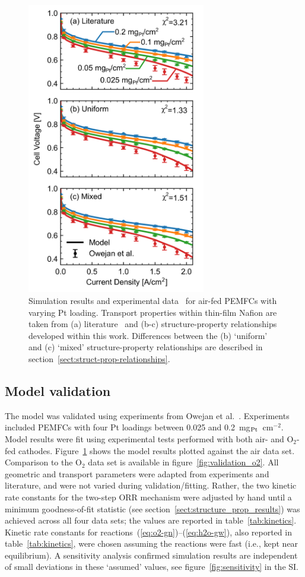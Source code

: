 \documentclass[final,3p,times,twocolumn]{elsarticle}    %
\newcommand{\crr}[1]{\color{red} #1 \color{black}}
\begin{document}
\begin{figure}[!tb]
    \centering
    \includegraphics[width=3.07in]{figures_uniform/validation-air-vert-3_07in.png}
    \crr{
    \caption{Simulation results and experimental data~\cite{bib:owejan_2013} for air-fed PEMFCs with varying Pt loading. Transport properties within thin-film Nafion are taken from (a) literature~\cite{bib:yadav_2012, bib:sethuraman_2009} and (b-c) structure-property relationships developed within this work. Differences between the (b) `uniform' and (c) `mixed' structure-property relationships are described in section~\ref{sect:struct-prop-relationships}.}}
    \label{fig:validation_air}
\end{figure}

\subsection{Model validation}
The model was validated using experiments from Owejan et al.~\cite{bib:owejan_2013}. Experiments included PEMFCs with four Pt loadings between 0.025 and 0.2~mg$_{\rm Pt}$~cm$^{-2}$. \crr{Model results were fit using experimental tests performed with both air- and O$_2$-fed cathodes.} Figure~\ref{fig:validation_air} shows the model results plotted against the air data set. Comparison to the O$_2$ data set is available in figure~\ref{fig:validation_o2}. All geometric and transport parameters were adapted from experiments and literature, and were not varied during validation/fitting. Rather, the two kinetic rate constants for the two-step ORR mechanism were adjusted by hand until a minimum goodness-of-fit statistic (see section~\ref{sect:structure_prop_results}) was achieved across all four data sets; the values are reported in table~\ref{tab:kinetics}. \crr{Kinetic rate constants for reactions~(\ref{eq:o2-gn})--(\ref{eq:h2o-gw}), also reported in table~\ref{tab:kinetics}, were chosen assuming the reactions were fast (i.e., kept near equilibrium). A sensitivity analysis confirmed simulation results are independent of small deviations in these `assumed' values, see figure~\ref{fig:sensitivity} in the SI.}
\end{document}
